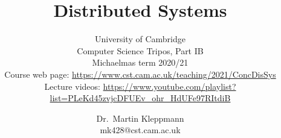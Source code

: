 \newcommand{\coursepath}{/teaching/2021/ConcDisSys}
\newcommand{\courseurl}{\url{https://www.cst.cam.ac.uk\coursepath}}
\newcommand{\thisyear}{2020/21}
\newcommand{\timestampexample}{2020-11-09T09:50:17+00:00}
\newcommand{\whenissecurity}{Part IB Easter term}
\newcommand{\ledgersystems}{https://www.cst.cam.ac.uk/teaching/2021/L47}
\newcommand{\multicore}{https://www.cst.cam.ac.uk/teaching/2021/L304}





\title{Distributed Systems}
\subtitle{University of Cambridge\\%
Computer Science Tripos, Part IB\\%
Michaelmas term \thisyear\\[1em]%
Course web page: \courseurl\\%
Lecture videos: \url{https://www.youtube.com/playlist?list=PLeKd45zvjcDFUEv_ohr_HdUFe97RItdiB}}

\author{Dr.\ Martin Kleppmann\\mk428@cst.cam.ac.uk}
\date{}
\maketitle

\def\sectionautorefname{Lecture}%
\def\subsectionautorefname{Section}%
\def\subsubsectionautorefname{Section}%


